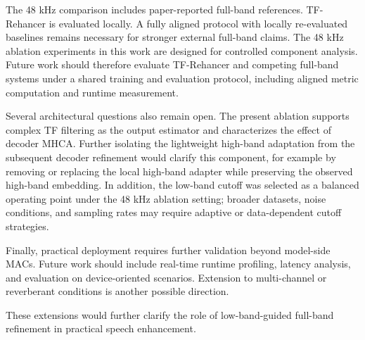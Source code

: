 The 48 kHz comparison includes paper-reported full-band references. TF-Rehancer is evaluated locally. A fully aligned protocol with locally re-evaluated baselines remains necessary for stronger external full-band claims. The 48 kHz ablation experiments in this work are designed for controlled component analysis. Future work should therefore evaluate TF-Rehancer and competing full-band systems under a shared training and evaluation protocol, including aligned metric computation and runtime measurement.

Several architectural questions also remain open. The present ablation supports complex TF filtering as the output estimator and characterizes the effect of decoder MHCA. Further isolating the lightweight high-band adaptation from the subsequent decoder refinement would clarify this component, for example by removing or replacing the local high-band adapter while preserving the observed high-band embedding. In addition, the low-band cutoff was selected as a balanced operating point under the 48 kHz ablation setting; broader datasets, noise conditions, and sampling rates may require adaptive or data-dependent cutoff strategies.

Finally, practical deployment requires further validation beyond model-side MACs. Future work should include real-time runtime profiling, latency analysis, and evaluation on device-oriented scenarios. Extension to multi-channel or reverberant conditions is another possible direction.

These extensions would further clarify the role of low-band-guided full-band refinement in practical speech enhancement.
